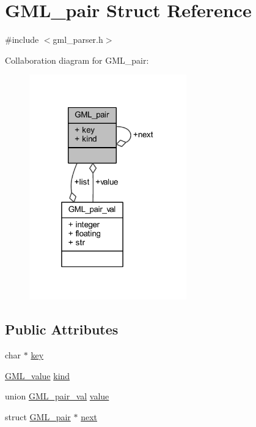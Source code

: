 \hypertarget{struct_g_m_l__pair}{}\section{G\+M\+L\+\_\+pair Struct Reference}
\label{struct_g_m_l__pair}


{\ttfamily \#include $<$gml\+\_\+parser.\+h$>$}



Collaboration diagram for G\+M\+L\+\_\+pair\+:\nopagebreak
\begin{figure}[H]
\begin{center}
\leavevmode
\includegraphics[width=193pt]{struct_g_m_l__pair__coll__graph}
\end{center}
\end{figure}
\subsection*{Public Attributes}
\begin{DoxyCompactItemize}
\item 
char $\ast$ \mbox{\hyperlink{struct_g_m_l__pair_a00e5de36c09fef63b8d439b4341f0655}{key}}
\item 
\mbox{\hyperlink{gml__scanner_8h_a2dc4839311e05f9a17adefcd0012b77f}{G\+M\+L\+\_\+value}} \mbox{\hyperlink{struct_g_m_l__pair_ab63f19fdd3fc40bfaba08d3af1a927d8}{kind}}
\item 
union \mbox{\hyperlink{union_g_m_l__pair__val}{G\+M\+L\+\_\+pair\+\_\+val}} \mbox{\hyperlink{struct_g_m_l__pair_aef8797e7d2fc0d2e2f628ce9c2783a6c}{value}}
\item 
struct \mbox{\hyperlink{struct_g_m_l__pair}{G\+M\+L\+\_\+pair}} $\ast$ \mbox{\hyperlink{struct_g_m_l__pair_aef47e6103f05e1411fa55f731972b592}{next}}
\end{DoxyCompactItemize}


